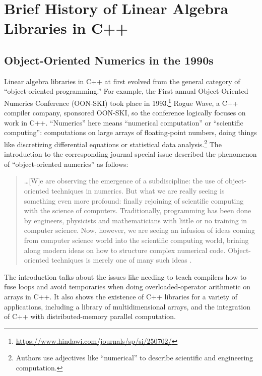 \chapter{Brief History of Linear Algebra Libraries in C++}

\section{Object-Oriented Numerics in the 1990s}

Linear algebra libraries in C++ at first evolved from the general category of
``object-oriented programming.'' For example, the First annual Object-Oriented
Numerics Conference (OON-SKI) took place in
1993.\footnote{\url{https://www.hindawi.com/journals/sp/si/250702/}}
Rogue Wave, a C++ compiler company, sponsored OON-SKI,
so the conference logically focuses on work in C++.
``Numerics'' here means ``numerical computation'' or ``scientific computing'':
computations on large arrays of floating-point numbers, doing things like
discretizing differential equations or statistical data analysis.\footnote{
Authors use adjectives like ``numerical'' to describe scientific and engineering
computation.}  The introduction to the corresponding journal special issue
described the phenomenon of ``object-oriented numerics'' as follows:

\begin{quote}
  \ldots [W]e are observing the emergence of a subdiscipline: the use of
  object-oriented techniques in numerics. But what we are really seeing is
  something even more profound: finally rejoining of scientific computing with
  the science of computers. Traditionally, programming has been done by
  engineers, physicists and mathematicians with little or no training in
  computer science. Now, however, we are seeing an infusion of ideas coming from
  computer science world into the scientific computing world, brining along
  modern ideas on how to structure complex numerical code. Object-oriented
  techniques is merely one of many such ideas \cite{Vermeulen1993}.
\end{quote}

The introduction talks about the issues like needing to teach compilers how to
fuse loops and avoid temporaries when doing overloaded-operator arithmetic on
arrays in C++. It also shows the existence of C++ libraries for a variety of
applications, including a library of multidimensional arrays, and the
integration of C++ with distributed-memory parallel computation.

